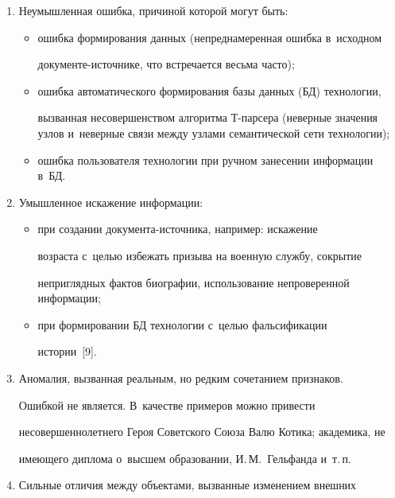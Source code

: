   \begin{enumerate}[1.]


  \item Неумышленная ошибка, причиной которой могут быть:


  \begin{itemize}


  \item ошибка формирования данных (непреднамеренная ошибка в~исходном  


до\-ку\-мен\-те-ис\-точ\-ни\-ке, что встречается весьма часто);


  \item ошибка автоматического формирования базы данных (БД) технологии, 


вызванная несовершенством алгоритма Т-пар\-се\-ра (неверные значения узлов и~неверные связи между узлами семантической сети технологии);


  \item ошибка пользователя технологии при ручном занесении информации в~БД.


  \end{itemize}


  \item Умышленное искажение информации:


  \begin{itemize}


  \item при создании до\-ку\-мен\-та-ис\-точ\-ни\-ка, например: искажение 


возраста с~\mbox{целью} избежать призыва на военную службу, сокрытие 


неприглядных фактов биографии, использование непроверенной информации;


  \item при формировании БД технологии с~целью фальсификации 


истории~[9].


  \end{itemize}


  \item Аномалия, вызванная реальным, но редким сочетанием признаков. 


Ошибкой не является. В~качестве примеров можно привести 


несовершеннолетнего Героя Советского Союза Валю Котика; академика, не 


имеющего диплома о~высшем образовании, И.\,М.~Гельфанда и~т.\,п.


  \item Сильные отличия между объектами, вызванные изменением внешних 



\end{enumerate}
